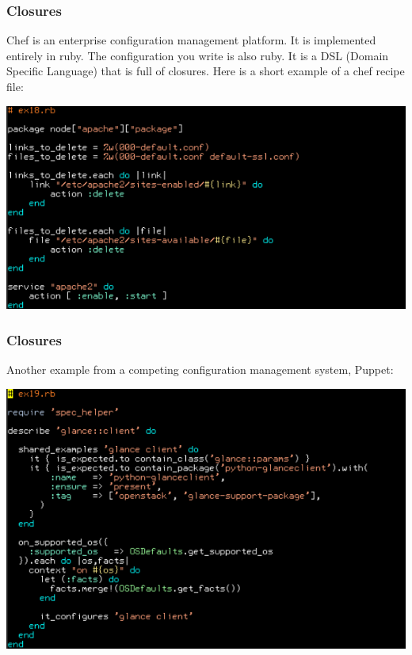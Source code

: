 \documentclass[helvetica,english,utf8,notitle,nologo]{beamer}
\begin{document}
\begin{frame}
  \frametitle{Closures}

  Chef is an enterprise configuration management platform. It is
  implemented entirely in ruby. The configuration you write is also
  ruby. It is a DSL (Domain Specific Language) that is full of
  closures. Here is a short example of a chef recipe file:

  \includegraphics[scale=0.53]{src_18}
\end{frame}

\begin{frame}
  \frametitle{Closures}

  Another example from a competing configuration management system,
  Puppet:

  \includegraphics[scale=0.53]{src_19}
\end{frame}
\end{document}
